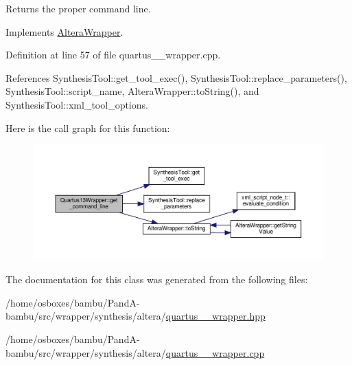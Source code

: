 Returns the proper command line. 



Implements \hyperlink{classAlteraWrapper_a1b6c44694f0bd28b6f458245fd373326}{Altera\+Wrapper}.



Definition at line 57 of file quartus\+\_\+\_\+wrapper.\+cpp.



References Synthesis\+Tool\+::get\+\_\+tool\+\_\+exec(), Synthesis\+Tool\+::replace\+\_\+parameters(), Synthesis\+Tool\+::script\+\_\+name, Altera\+Wrapper\+::to\+String(), and Synthesis\+Tool\+::xml\+\_\+tool\+\_\+options.

Here is the call graph for this function\+:
\nopagebreak
\begin{figure}[H]
\begin{center}
\leavevmode
\includegraphics[width=350pt]{dc/d06/classQuartus13Wrapper_aa3d9af79c6ebd372589c482dd6fc3eab_cgraph}
\end{center}
\end{figure}


The documentation for this class was generated from the following files\+:\begin{DoxyCompactItemize}
\item 
/home/osboxes/bambu/\+Pand\+A-\/bambu/src/wrapper/synthesis/altera/\hyperlink{quartus__13__wrapper_8hpp}{quartus\+\_\+\_\+wrapper.\+hpp}\item 
/home/osboxes/bambu/\+Pand\+A-\/bambu/src/wrapper/synthesis/altera/\hyperlink{quartus__13__wrapper_8cpp}{quartus\+\_\+\_\+wrapper.\+cpp}\end{DoxyCompactItemize}
